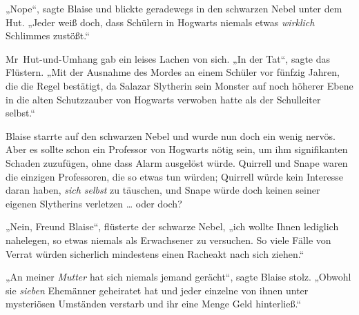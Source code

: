 „Nope“, sagte Blaise und blickte geradewegs in den schwarzen Nebel unter dem Hut.
„Jeder weiß doch, dass Schülern in Hogwarts niemals etwas \emph{wirklich} Schlimmes zustößt.“

Mr~Hut-und-Umhang gab ein leises Lachen von sich.
„In der Tat“, sagte das Flüstern.
„Mit der Ausnahme des Mordes an einem Schüler vor fünfzig Jahren, die die Regel bestätigt, da Salazar Slytherin sein Monster auf noch höherer Ebene in die alten Schutzzauber von Hogwarts verwoben hatte als der Schulleiter selbst.“

Blaise starrte auf den schwarzen Nebel und wurde nun doch ein wenig nervös. Aber es sollte schon ein Professor von Hogwarts nötig sein, um ihm signifikanten Schaden zuzufügen, ohne dass Alarm ausgelöst würde. Quirrell und Snape waren die einzigen Professoren, die so etwas tun würden; Quirrell würde kein Interesse daran haben, \emph{sich selbst} zu täuschen, und Snape würde doch keinen seiner eigenen Slytherins verletzen … oder doch?

„Nein, Freund Blaise“, flüsterte der schwarze Nebel, „ich wollte Ihnen lediglich nahelegen, so etwas niemals als Erwachsener zu versuchen. So viele Fälle von Verrat würden sicherlich mindestens einen Racheakt nach sich ziehen.“

„An meiner \emph{Mutter} hat sich niemals jemand gerächt“, sagte Blaise stolz.
„Obwohl sie \emph{sieben} Ehemänner geheiratet hat und jeder einzelne von ihnen unter mysteriösen Umständen verstarb und ihr eine Menge Geld hinterließ.“

